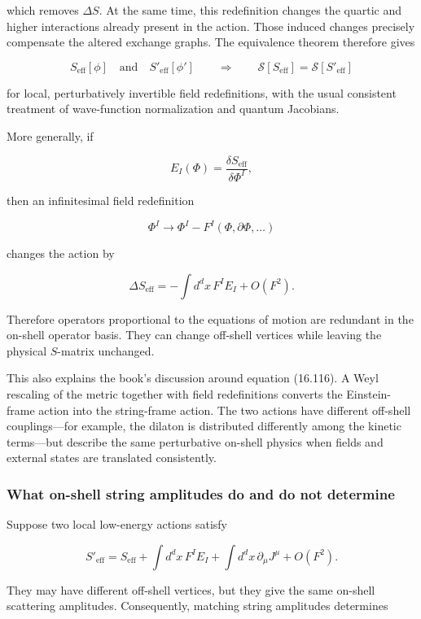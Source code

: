 \documentclass[
  10pt,
  a4paper,
  openany]{book}
\begin{document}
which removes \(\Delta S\). At the same time, this redefinition changes
the quartic and higher interactions already present in the action. Those
induced changes precisely compensate the altered exchange graphs. The
equivalence theorem therefore gives

\[
S_{\mathrm{eff}}[\phi]
\quad\text{and}\quad
S'_{\mathrm{eff}}[\phi']
\qquad\Longrightarrow\qquad
\mathcal S[S_{\mathrm{eff}}]
=
\mathcal S[S'_{\mathrm{eff}}]
\]

for local, perturbatively invertible field redefinitions, with the usual
consistent treatment of wave-function normalization and quantum
Jacobians.

More generally, if

\[
E_I(\Phi)=\frac{\delta S_{\mathrm{eff}}}{\delta\Phi^I},
\]

then an infinitesimal field redefinition

\[
\Phi^I\longrightarrow\Phi^I-F^I(\Phi,\partial\Phi,\ldots)
\]

changes the action by

\[
\Delta S_{\mathrm{eff}}
=
-\int d^dx\,F^I E_I
+O(F^2).
\]

Therefore operators proportional to the equations of motion are
redundant in the on-shell operator basis. They can change off-shell
vertices while leaving the physical \(S\)-matrix unchanged.

This also explains the book's discussion around equation (16.116). A
Weyl rescaling of the metric together with field redefinitions converts
the Einstein-frame action into the string-frame action. The two actions
have different off-shell couplings---for example, the dilaton is
distributed differently among the kinetic terms---but describe the same
perturbative on-shell physics when fields and external states are
translated consistently.

\subsubsection{What on-shell string amplitudes do and do not
determine}\label{what-on-shell-string-amplitudes-do-and-do-not-determine}

Suppose two local low-energy actions satisfy

\[
S'_{\mathrm{eff}}
=S_{\mathrm{eff}}
+\int d^dx\,F^I E_I
+\int d^dx\,\partial_\mu J^\mu
+O(F^2).
\]

They may have different off-shell vertices, but they give the same
on-shell scattering amplitudes. Consequently, matching string amplitudes
determines
\end{document}
